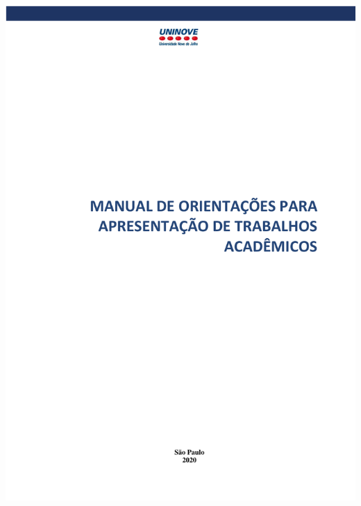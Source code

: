 
\includegraphics[page=26,width=0.9\linewidth,height=0.9\textheight]{material-de-apoio/pdfs/Manual_de_Trabalhos_Academicos_ABNT_UNINOVE.pdf}

%

\newpage